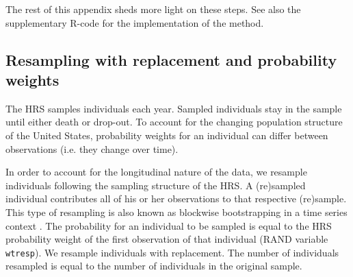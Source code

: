 \documentclass[11pt,oneside,a4paper]{article} %
\begin{document}
\begin{appendices}
The rest of this appendix sheds more light on these steps. See also the supplementary R-code for the implementation of the method.
\subsection{Resampling with replacement and probability weights}
The HRS samples individuals each year. Sampled individuals stay in the sample until either death or drop-out. To account for the changing population structure of the United States, probability weights for an individual can differ between observations (i.e. they change over time).

In order to account for the longitudinal nature of the data, we resample individuals following the sampling structure of the HRS. A (re)sampled individual contributes all of his or her observations to that respective (re)sample. This type of resampling is also known as blockwise bootstrapping in a time series context \citep{Bbuhlmann1995blockwise}. The probability for an individual to be sampled is equal to the HRS probability weight of the first observation of that individual (RAND variable \texttt{wtresp}). We resample individuals with replacement. The number of individuals resampled is equal to the number of individuals in the original sample.

\end{appendices}
\end{document}
